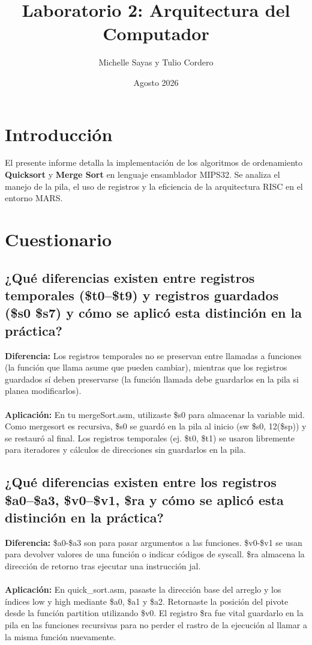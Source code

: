 \documentclass[12pt]{article}
\title{Laboratorio 2: Arquitectura del Computador}
\author{Michelle Sayas y Tulio Cordero}
\date{Agosto 2026}
\begin{document}
\maketitle

\section{Introducción}
El presente informe detalla la implementación de los algoritmos de ordenamiento \textbf{Quicksort} y \textbf{Merge Sort} en lenguaje ensamblador MIPS32. Se analiza el manejo de la pila, el uso de registros y la eficiencia de la arquitectura RISC en el entorno MARS.

\section{Cuestionario}

\subsection{¿Qué diferencias existen entre registros temporales (\$t0–\$t9) y registros guardados (\$s0
\$s7) y cómo se aplicó esta distinción en la práctica?}
\textbf{Diferencia:} Los registros temporales no se preservan entre llamadas a funciones (la función que llama asume que pueden cambiar), mientras que los registros guardados sí deben preservarse (la función llamada debe guardarlos en la pila si planea modificarlos).
\\
\\
\textbf{Aplicación:} En tu mergeSort.asm, utilizaste \$s0 para almacenar la variable mid. Como mergesort es recursiva, \$s0 se guardó en la pila al inicio (sw \$s0, 12(\$sp)) y se restauró al final. Los registros temporales (ej. \$t0, \$t1) se usaron libremente para iteradores y cálculos de direcciones sin guardarlos en la pila.

\subsection{¿Qué diferencias existen entre los registros \$a0–\$a3, \$v0–\$v1, \$ra y cómo se aplicó esta 
distinción en la práctica? }
\textbf{Diferencia:} \$a0-\$a3 son para pasar argumentos a las funciones. \$v0-\$v1 se usan para devolver valores de una función o indicar códigos de syscall. \$ra almacena la dirección de retorno tras ejecutar una instrucción jal.
\\
\\
\textbf{Aplicación: }En quick\_sort.asm, pasaste la dirección base del arreglo y los índices low y high mediante \$a0, \$a1 y \$a2. Retornaste la posición del pivote desde la función partition utilizando \$v0. El registro \$ra fue vital guardarlo en la pila en las funciones recursivas para no perder el rastro de la ejecución al llamar a la misma función nuevamente.
\end{document}

